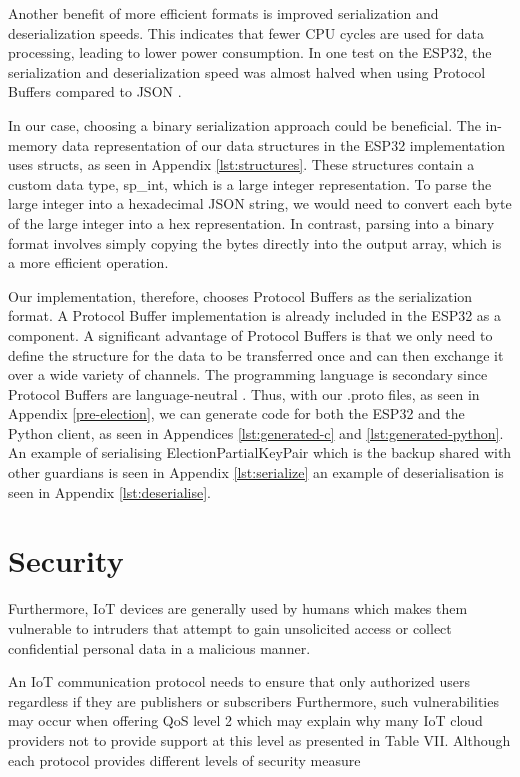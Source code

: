 Another benefit of more efficient formats is improved serialization and deserialization speeds. This indicates that fewer CPU cycles are used for data processing, leading to lower power consumption. In one test on the ESP32, the serialization and deserialization speed was almost halved when using Protocol Buffers compared to JSON \cite[11-12]{serialisation-comparison}. 

In our case, choosing a binary serialization approach could be beneficial. The in-memory data representation of our data structures in the ESP32 implementation uses structs, as seen in Appendix \ref{lst:structures}. These structures contain a custom data type, sp\_int, which is a large integer representation. To parse the large integer into a hexadecimal JSON string, we would need to convert each byte of the large integer into a hex representation. In contrast, parsing into a binary format involves simply copying the bytes directly into the output array, which is a more efficient operation.

Our implementation, therefore, chooses Protocol Buffers as the serialization format. A Protocol Buffer implementation is already included in the ESP32 as a component. A significant advantage of Protocol Buffers is that we only need to define the structure for the data to be transferred once and can then exchange it over a wide variety of channels. The programming language is secondary since Protocol Buffers are language-neutral \cite[224]{protobuffer}. Thus, with our .proto files, as seen in Appendix \ref{pre-election}, we can generate code for both the ESP32 and the Python client, as seen in Appendices \ref{lst:generated-c} and \ref{lst:generated-python}. An example of serialising ElectionPartialKeyPair which is the backup shared with other guardians is seen in Appendix \ref{lst:serialize} an example of deserialisation is seen in Appendix \ref{lst:deserialise}. 

\section{Security}
Furthermore,
IoT devices are generally used by humans which makes them
vulnerable to intruders that attempt to gain unsolicited access
or collect confidential personal data in a malicious manner.
\cite[23]{protocols}

An IoT
communication protocol needs to ensure that only authorized
users regardless if they are publishers or subscribers
Furthermore, such vulnerabilities may occur when
offering QoS level 2 which may explain why many IoT cloud
providers not to provide support at this level as presented in
Table VII. 
Although each protocol provides different levels of
security measure\cite[23]{protocols}


